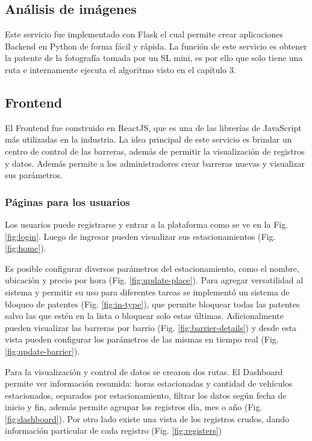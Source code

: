 \subsection{Análisis de imágenes}

Este servicio fue implementado con Flask el cual permite crear aplicaciones Backend en Python de forma fácil y rápida. La función de este servicio es obtener la patente de la fotografía tomada por un SL mini, es por ello que solo tiene una ruta e internamente ejecuta el algoritmo visto en el capítulo 3.

\subsection{Frontend}

El Frontend fue construido en ReactJS, que es una de las librerías de JavaScript más utilizadas en la industria. La idea principal de este servicio es brindar un centro de control de las barreras, además de permitir la visualización de registros y datos. Además permite a los administradores crear barreras nuevas y visualizar sus parámetros.

\subsubsection{Páginas para los usuarios}

Los usuarios puede registrarse y entrar a la plataforma como se ve en la Fig. \ref{fig:login}. Luego de ingresar pueden visualizar sus estacionamientos (Fig. \ref{fig:home}).

Es posible configurar diversos parámetros del estacionamiento, como el nombre, ubicación y precio por hora (Fig. \ref{fig:update-place}).
Para agregar versatilidad al sistema y permitir su uso para diferentes tareas se implementó un sistema de bloqueo de patentes (Fig. \ref{fig:in-type}), que permite bloquear todas las patentes salvo las que estén en la lista o bloquear solo estas últimas. Adicionalmente pueden visualizar las barreras por barrio (Fig. \ref{fig:barrier-details}) y desde esta vista pueden configurar los parámetros de las mismas en tiempo real (Fig. \ref{fig:update-barrier}).

Para la visualización y control de datos se crearon dos rutas.
El Dashboard permite ver información resumida: horas estacionadas y cantidad de vehículos estacionados, separados por estacionamiento, filtrar los datos según fecha de inicio y fin, además permite agrupar los registros día, mes o año (Fig. \ref{fig:dashboard}).
Por otro lado existe una vista de los registros crudos, dando información particular de cada registro (Fig. \ref{fig:registers})


